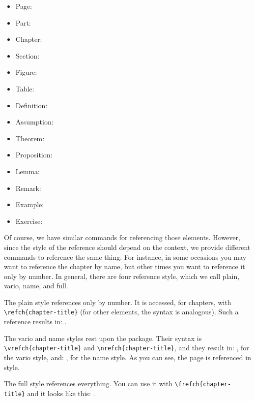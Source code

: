 \begin{multicols}{2}
\setlength{\columnseprule}{0pt}
\begin{itemize}
	\item Page: 
	\item Part: 
	\item Chapter: 
	\item Section: 
	\item Figure: 
	\item Table: 
	\item Definition: 
	\item Assumption: 
	\item Theorem: 
	\item Proposition: 
	\item Lemma: 
	\item Remark: 
	\item Example: 
	\item Exercise: 
\end{itemize}
\end{multicols}

Of course, we have similar commands for referencing those elements. 
However, since the style of the reference should depend on the context, 
we provide different commands to reference the same thing. For instance, 
in some occasions you may want to reference the chapter by name, but 
other times you want to reference it only by number. In general, there 
are four reference style, which we call plain, vario, name, and full.

The plain style references only by number. It is accessed, for chapters, 
with \lstinline|\refch{chapter-title}| (for other elements, the syntax 
is analogous). Such a reference results in: .

The vario and name styles rest upon the  package. 
Their syntax is \lstinline|\vrefch{chapter-title}| and 
\lstinline|\nrefch{chapter-title}|, and they result in: 
, for the vario style, and: , for 
the name style. As you can see, the page is referenced in 
 style.

The full style references everything. You can use it with 
\lstinline|\frefch{chapter-title}| and it looks like this: 
.

